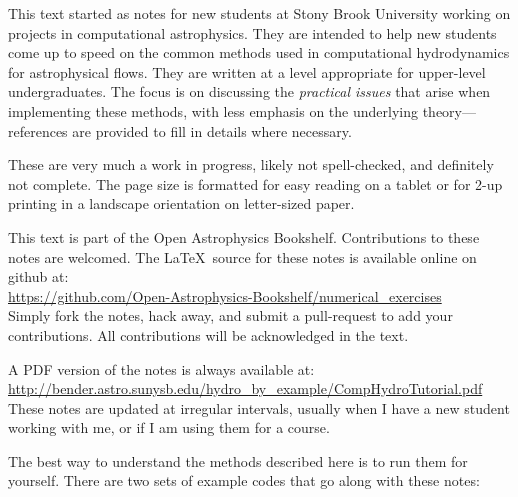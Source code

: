 
This text started as notes for new students at Stony Brook University
working on projects in computational astrophysics.  They are
intended  to help new students come up to speed on the
common methods used in computational hydrodynamics for astrophysical
flows.  They are written at a level appropriate for upper-level
undergraduates.  The focus is on discussing the {\em practical issues}
that arise when implementing these methods, with less emphasis on the
underlying theory---references are provided to fill in details where
necessary.

These are very much a work in progress, likely not spell-checked, and
definitely not complete.  The page size is formatted for easy reading
on a tablet or for 2-up printing in a landscape orientation on
letter-sized paper.  

This text is part of the Open Astrophysics Bookshelf.
Contributions to these notes are welcomed.  The \LaTeX\ source
for these notes is available online on github at: \\[0.25em]
%
\url{https://github.com/Open-Astrophysics-Bookshelf/numerical_exercises} \\[0.25em]
%
Simply fork the notes, hack away, and submit a pull-request to add
your contributions.  All contributions will be acknowledged in the text.


A PDF version of the notes is always available
at: \\[0.25em]
%
\url{http://bender.astro.sunysb.edu/hydro_by_example/CompHydroTutorial.pdf} \\[0.25em]
%
These notes are updated at irregular intervals, usually when I have a
new student working with me, or if I am using them for a course.

The best way to understand the methods described here is to run
them for yourself.  There are two sets of example codes that
go along with these notes:


